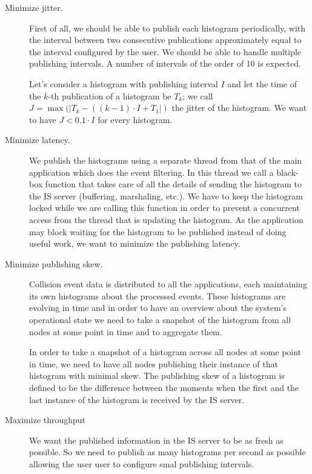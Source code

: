 \begin{description}
\item[Minimize jitter.]

First of all, we should be able to publish each histogram periodically, with the interval between two consecutive publications approximately equal to the interval configured by the user. We should be able to handle multiple publishing intervals. A number of intervals of the order of 10 is expected.

Let's consider a histogram with publishing interval $I$ and let the time of the $k$-th publication of a histogram be $T_k$; we call $J=\max(\lvert T_k-((k-1) \cdot I+T_1\rvert)$ the jitter of the histogram. We want to have $J < 0.1\cdot I$ for every histogram.

\item[Minimize latency.]

We publish the histograms using a separate thread from that of the main application which does the event filtering. In this thread we call a black-box function that takes care of all the details of sending the histogram to the IS server (buffering, marshaling, etc.). We have to keep the histogram locked while we are calling this function in order to prevent a concurrent access from the thread that is updating the histogram. As the application may block waiting for the histogram to be published instead of doing useful work, we want to minimize the publishing latency.

\item [Minimize publishing skew.]

Collision event data is distributed to all the applications, each maintaining its own histograms about the processed events. These histograms are evolving in time and in order to have an overview about the system’s operational state we need to take a snapshot of the histogram from all nodes at some point in time and to aggregate them.

In order to take a snapshot of a histogram across all nodes at some point in time, we need to have all nodes publishing their instance of that histogram with minimal skew. The publishing skew of a histogram is defined to be the difference between the moments when the first and the last instance of the histogram is received by the IS server.  

\item [Maximize throughput]

We want the published information in the IS server to be as fresh as possible. So we need to publish as many histograms per second as possible allowing the user user to configure smal publishing intervals.


\end{description}

